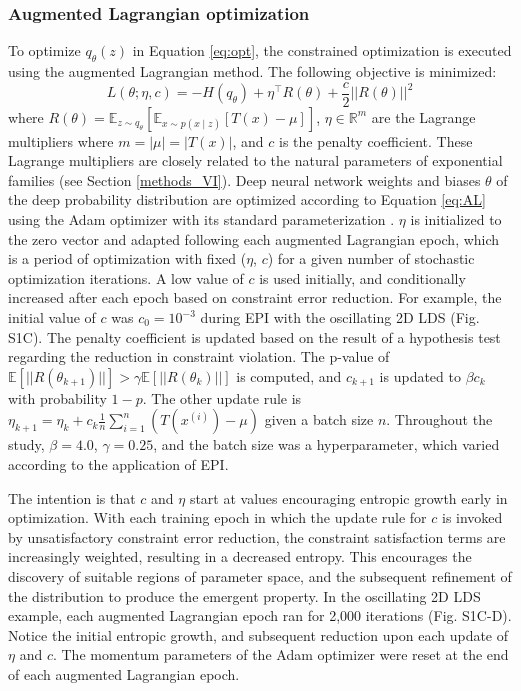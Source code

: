 \documentclass[11pt]{article}
\begin{document}
\subsubsection{Augmented Lagrangian optimization}\label{methods_AL_opt}
To optimize $q_\theta(z)$ in Equation \ref{eq:opt}, the constrained optimization is executed using the augmented Lagrangian method.  The following objective is minimized:
\begin{equation} \label{eq:AL}
L(\theta; \eta, c) = -H(q_\theta) + \eta^\top R(\theta) + \frac{c}{2}||R(\theta)||^2
\end{equation}
where $R(\theta) = \mathbb{E}_{z \sim q_\theta}\left[ \mathbb{E}_{x\sim p(x \mid z)}\left[T(x) - \mu \right] \right]$, $\eta \in \mathbb{R}^m$ are the Lagrange multipliers where $m = |\mu| = |T(x)|$,  and $c$ is the penalty coefficient. 
These Lagrange multipliers are closely related to the natural parameters of exponential families (see Section \ref{methods_VI}).
Deep neural network weights and biases $\theta$ of the deep probability distribution are optimized according to Equation \ref{eq:AL} using the Adam optimizer with its standard parameterization \cite{kingma2014adam}.
$\eta$ is initialized to the zero vector and adapted following each augmented Lagrangian epoch, which is a period of optimization with fixed ($\eta$, $c$) for a given number of stochastic optimization iterations. 
A low value of $c$ is used initially, and conditionally increased after each epoch based on constraint error reduction.
For example, the initial value of $c$ was $c_0 = 10^{-3}$ during EPI with the oscillating 2D LDS (Fig. S1C).
The penalty coefficient is updated based on the result of a hypothesis test regarding the reduction in constraint violation.  
The p-value of $\mathbb{E}[||R(\theta_{k+1})||] > \gamma \mathbb{E} \left[||R(\theta_{k})|| \right]$ is computed, and $c_{k+1}$ is updated  to $\beta c_k$ with probability $1-p$.  
The other update rule is $\eta_{k+1} = \eta_k + c_k \frac{1}{n} \sum_{i=1}^n (T(x^{(i)}) - \mu)$ given a batch size $n$.
Throughout the study, $\beta = 4.0$, $\gamma = 0.25$, and the batch size was a hyperparameter, which varied according to the application of EPI.

The intention is that $c$ and $\eta$ start at values encouraging entropic growth early in optimization.  
With each training epoch in which the update rule for $c$ is invoked by unsatisfactory constraint error reduction, the constraint satisfaction terms are increasingly weighted, resulting in a decreased entropy.
This encourages the discovery of suitable regions of parameter space, and the subsequent refinement of the distribution to produce the emergent property.
In the oscillating 2D LDS example, each augmented Lagrangian epoch ran for 2,000 iterations (Fig. S1C-D).
Notice the initial entropic growth, and subsequent reduction upon each update of $\eta$ and $c$.
The momentum parameters of the Adam optimizer were reset at the end of each augmented Lagrangian epoch.
\end{document}
